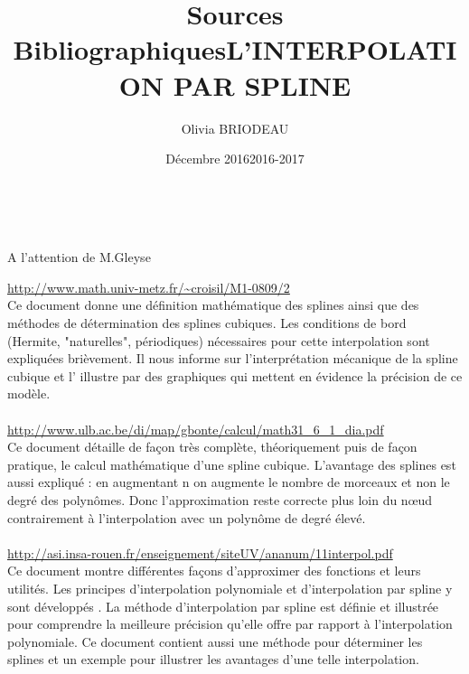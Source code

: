 \documentclass{article}
\title{Sources Bibliographiques}
\author{Olivia BRIODEAU}
\date{D\'{e}cembre 2016}
\begin{document}
\maketitle

\vspace{10\baselineskip}
\begin{center}
\makeatother
\title{L'INTERPOLATION PAR SPLINE}\\
\end{center}

\vspace{12\baselineskip}
\begin{center}
A l'attention de M.Gleyse\\
\date{2016-2017}
\end{center}

\newpage
\begingroup\raggedleft
{\color{blue}
\url{http://www.math.univ-metz.fr/~croisil/M1-0809/2}}
\endgroup
\\
Ce document donne une d\'{e}finition math\'{e}matique des splines ainsi que des m\'{e}thodes de d\'{e}termination des splines cubiques. Les conditions de bord (Hermite, "naturelles", p\'{e}riodiques) n\'{e}cessaires pour cette interpolation sont expliqu\'{e}es bri\`{e}vement. Il nous informe sur l'interpr\'{e}tation m\'{e}canique de la spline cubique et l' illustre par des graphiques qui mettent en \'{e}vidence la pr\'{e}cision de ce mod\`{e}le.
\\\\
{\color{blue}
\url{http://www.ulb.ac.be/di/map/gbonte/calcul/math31_6_1_dia.pdf}} 
\\
Ce document d\'{e}taille de fa\c{c}on tr\`{e}s compl\`{e}te, th\'{e}oriquement puis de fa\c{c}on pratique, le calcul math\'{e}matique d'une spline cubique. L'avantage des splines est aussi expliqu\'{e} : en augmentant n on augmente le nombre de morceaux et non le degr\'{e} des polyn\^{o}mes. Donc l'approximation reste correcte plus loin du n\oe{}ud contrairement \`{a} l'interpolation avec un polyn\^{o}me de degr\'{e} \'{e}lev\'{e}.
\\\\
{\color{blue}
\url{http://asi.insa-rouen.fr/enseignement/siteUV/ananum/11interpol.pdf}}
\\
Ce document montre diff\'{e}rentes fa\c{c}ons d'approximer des fonctions et leurs utilit\'{e}s. Les principes d'interpolation polynomiale et d'interpolation par spline y sont d\'{e}velopp\'{e}s . La m\'{e}thode d'interpolation par spline est d\'{e}finie et illustr\'{e}e pour comprendre la meilleure pr\'{e}cision qu'elle offre par rapport \`{a} l'interpolation polynomiale. Ce document contient aussi une m\'{e}thode pour d\'{e}terminer les splines et un exemple pour illustrer les avantages d'une telle interpolation.
\end{document}
